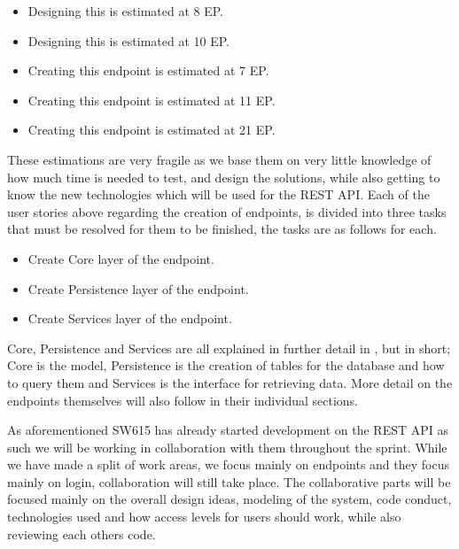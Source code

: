 \begin{itemize}[style=unboxed]
	\item {} 
	Designing this is estimated at 8 EP.
	\item {}
	Designing this is estimated at 10 EP.
	\item {}
	Creating this endpoint is estimated at 7 EP.
	\item {}
	Creating this endpoint is estimated at 11 EP.
	\item {}
	Creating this endpoint is estimated at 21 EP.
\end{itemize}
These estimations are very fragile as we base them on very little knowledge of how much time is needed to test, and design the solutions, while also getting to know the new technologies which will be used for the REST API.
Each of the user stories above regarding the creation of endpoints, is divided into three tasks that must be resolved for them to be finished, the tasks are as follows for each.
\begin{itemize}
    \item Create Core layer of the endpoint.
    \item Create Persistence layer of the endpoint.
    \item Create Services layer of the endpoint.
\end{itemize}
Core, Persistence and Services are all explained in further detail in , but in short; Core is the model, Persistence is the creation of tables for the database and how to query them and Services is the interface for retrieving data.
More detail on the endpoints themselves will also follow in their individual sections.

As aforementioned SW615 has already started development on the REST API as such we will be working in collaboration with them throughout the sprint.
While we have made a split of work areas, we focus mainly on endpoints and they focus mainly on login, collaboration will still take place.
The collaborative parts will be focused mainly on the overall design ideas, modeling of the system, code conduct, technologies used and how access levels for users should work, while also reviewing each others code.

